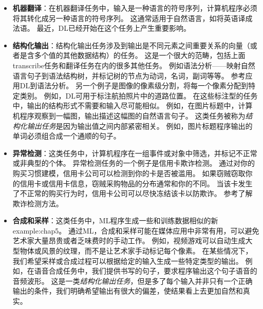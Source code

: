 \begin{itemize}
    \item \textbf{机器翻译}：在机器翻译任务中，输入是一种语言的符号序列，计算机程序必须将其转化成另一种语言的符号序列。
    这通常适用于自然语言，如将英语译成法语。
    最近，\gls{DL}已经开始在这个任务上产生重要影响\citep{Sutskever-et-al-NIPS2014,Bahdanau-et-al-ICLR2015-small}。

    \item \textbf{结构化输出}：结构化输出任务涉及到输出是不同元素之间重要关系的向量（或者是含多个值的其他数据结构）的任务。
    这是一个很大的范畴，包括上面\gls{transcribe}任务和翻译任务在内的很多其他任务。
    例如语法分析——映射自然语言句子到语法结构树，并标记树的节点为动词，名词，副词等等。
    参考\cite{Collobert-AISTATS2011}应用\gls{DL}到语法分析。
    另一个例子是图像的像素级分割，将每一个像素分配到特定类别。
    例如，\gls{DL}可用于标注航拍照片中的道路位置\citep{MnihHinton2010}。
    在这些标注型的任务中，输出的结构形式不需要和输入尽可能相似。
    例如，在图片标题中，计算机程序观察到一幅图，输出描述这幅图的自然语言句子\citep{Kiros-et-al-ICML2014,Kiros-et-al-arxiv2014,Mao-et-al-2014,Vinyals-et-al-CVPR2015,Donahue-et-al-arxiv2014,Karpathy+Li-CVPR2015,Fang-et-al-CVPR2015,Xu-et-al-ICML2015}。
    这类任务被称为\emph{结构化输出任务}是因为输出值之间内部紧密相关。
    例如，图片标题程序输出的单词必须组合成一个通顺的句子。


    \item \textbf{异常检测}：这类任务中，计算机程序在一组事件或对象中筛选，并标记不正常或非典型的个体。
    异常检测任务的一个例子是信用卡欺诈检测。
    通过对你的购买习惯建模，信用卡公司可以检测到你的卡是否被滥用。
    如果窃贼窃取你的信用卡或信用卡信息，窃贼采购物品的分布通常和你的不同。
    当该卡发生了不正常的购买行为时，信用卡公司可以尽快冻结该卡以防欺诈。
    参考\cite{chandola2009anomaly}了解欺诈检测方法。

    \item \textbf{合成和采样}：这类任务中，\gls{ML}程序生成一些和训练数据相似的新\gls{example:chap5}。
    通过\gls{ML}，合成和采样可能在媒体应用中非常有用，可以避免艺术家大量昂贵或者乏味费时的手动工作。
    例如，视频游戏可以自动生成大型物体或风景的纹理，而不是让艺术家手动标记每个像素\citep{Luo+al-AISTATS2013-small}。
    在某些情况下，我们希望采样或合成过程可以根据给定的输入生成一些特定类型的输出。
    例如，在语音合成任务中，我们提供书写的句子，要求程序输出这个句子语音的音频波形。
    这是一类\emph{结构化输出任务}，但是多了每个输入并非只有一个正确输出的条件，我们明确希望输出有很大的偏差，使结果看上去更加自然和真实。


\end{itemize}
